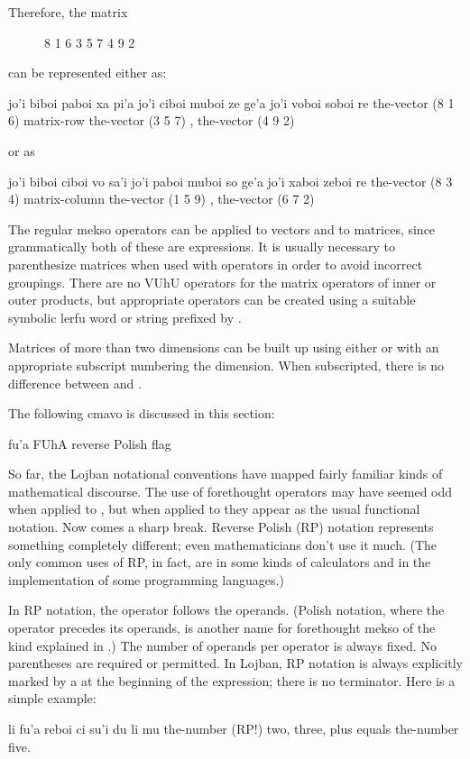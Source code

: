 Therefore, the  matrix
\begin{description}
\item[] 8 1 6 3 5 7 4 9 2
\end{description}

can be represented either as:
\begin{example}
jo'i biboi paboi xa pi'a jo'i ciboi muboi ze\n
\T	ge'a jo'i voboi soboi re\n
the-vector (8 1 6) matrix-row the-vector (3 5 7)\n
\T	, the-vector (4 9 2)
\end{example}

{\noindent}or as
\begin{example}
jo'i biboi ciboi vo sa'i jo'i paboi muboi so\n
\T	ge'a jo'i xaboi zeboi re\n
the-vector (8 3 4) matrix-column the-vector (1 5 9)\n
\T	, the-vector (6 7 2)
\end{example}

The regular mekso operators can be applied to vectors and to
    matrices, since grammatically both of these are expressions. It
    is usually necessary to parenthesize matrices when used with
    operators in order to avoid incorrect groupings. There are no
    VUhU operators for the matrix operators of inner or outer
    products, but appropriate operators can be created using a
    suitable symbolic lerfu word or string prefixed by . 

Matrices of more than two dimensions can be built up using
    either  or  with an appropriate subscript
    numbering the dimension. When subscripted, there is no
    difference between  and .



The following cmavo is discussed in this section:

   fu'a    FUhA    reverse Polish flag

So far, the Lojban notational conventions have mapped fairly
    familiar kinds of mathematical discourse. The use of
    forethought operators may have seemed odd when applied to
    \q{+}, but when applied to  they appear as the usual
    functional notation. Now comes a sharp break. Reverse Polish
    (RP) notation represents something completely different; even
    mathematicians don't use it much. (The only common uses of RP,
    in fact, are in some kinds of calculators and in the
    implementation of some programming languages.) 

In RP notation, the operator follows the operands. (Polish
    notation, where the operator precedes its operands, is another
    name for forethought mekso of the kind explained in .) The number of operands per operator
    is always fixed. No parentheses are required or permitted. In
    Lojban, RP notation is always explicitly marked by a 
    at the beginning of the expression; there is no terminator.
    Here is a simple example:
\begin{example}
li fu'a reboi ci su'i\n
\T	du li mu\n
the-number (RP!) two, three, plus\n
\T	equals the-number five.
\end{example}

